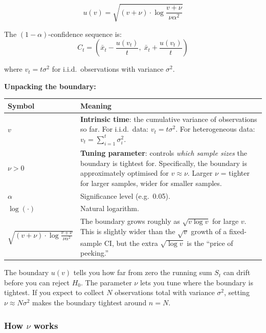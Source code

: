 \documentclass[12pt, a4paper]{article}
\begin{document}
\[
  \boxed{u(v) = \sqrt{(v + \nu) \cdot \log\!\frac{v + \nu}{\nu \alpha^2}}}
\]

The $(1-\alpha)$-confidence sequence is:
\[
  C_t = \left(\bar{x}_t - \frac{u(v_t)}{t},\; \bar{x}_t + \frac{u(v_t)}{t}
        \right)
\]

where $v_t = t\sigma^2$ for i.i.d.\ observations with variance $\sigma^2$.

\textbf{Unpacking the boundary:}

\begin{center}
\renewcommand{\arraystretch}{1.4}
\begin{tabular}{@{} >{\raggedright}p{2.5cm} p{9.5cm} @{}}
\toprule
\textbf{Symbol} & \textbf{Meaning} \\
\midrule
$v$ & \textbf{Intrinsic time}: the cumulative variance of observations so far.
  For i.i.d.\ data: $v_t = t\sigma^2$.  For heterogeneous data: $v_t =
  \sum_{i=1}^t \sigma_i^2$. \\
$\nu > 0$ & \textbf{Tuning parameter}: controls \emph{which sample sizes} the
  boundary is tightest for.  Specifically, the boundary is approximately
  optimised for $v \approx \nu$.  Larger $\nu$ = tighter for larger samples,
  wider for smaller samples. \\
$\alpha$ & Significance level (e.g.\ 0.05). \\
$\log(\cdot)$ & Natural logarithm. \\
$\sqrt{(v+\nu) \cdot \log\frac{v+\nu}{\nu\alpha^2}}$
  & The boundary grows roughly as $\sqrt{v \log v}$ for large $v$.  This is
  slightly wider than the $\sqrt{v}$ growth of a fixed-sample CI, but the
  extra $\sqrt{\log v}$ is the ``price of peeking.'' \\
\bottomrule
\end{tabular}
\end{center}

\begin{plainlanguage}
The boundary $u(v)$ tells you how far from zero the running sum $S_t$ can
drift before you can reject $H_0$.  The parameter $\nu$ lets you tune where
the boundary is tightest.  If you expect to collect $N$ observations total with
variance $\sigma^2$, setting $\nu \approx N\sigma^2$ makes the boundary
tightest around $n = N$.
\end{plainlanguage}

\subsubsection*{How $\nu$ works}
\end{document}
